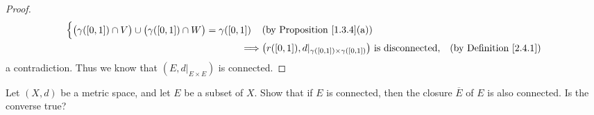 \begin{proof}
\begin{align*}
\begin{cases}
                       \big(\gamma([0, 1]) \cap V\big) \cup \big(\gamma([0, 1]) \cap W\big) = \gamma([0, 1])
                   \end{cases} & \text{(by Proposition \ref{1.3.4}(a))}                                         \\
        \implies & \big(r([0, 1]), d|_{\gamma([0, 1]) \times \gamma([0, 1])}\big) \text{ is disconnected},                                     & \text{(by Definition \ref{2.4.1})}
    \end{align*}
    a contradiction.
    Thus we know that \((E, d|_{E \times E})\) is connected.
\end{proof}

\begin{exercise}\label{ex 2.4.8}
    Let \((X, d)\) be a metric space, and let \(E\) be a subset of \(X\).
    Show that if \(E\) is connected, then the closure \(\overline{E}\) of \(E\) is also connected.
    Is the converse true?
\end{exercise}

